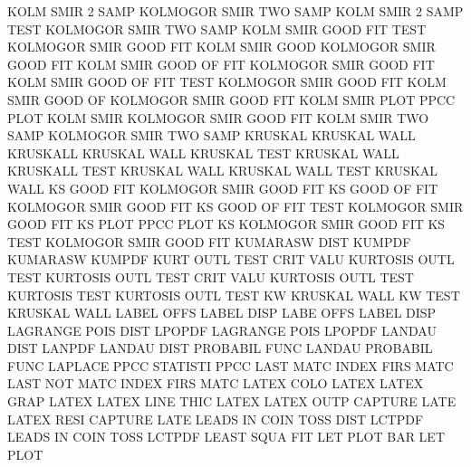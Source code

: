 KOLM     SMIR 2    SAMP                 KOLMOGOR SMIR TWO  SAMP
KOLM     SMIR 2    SAMP TEST            KOLMOGOR SMIR TWO  SAMP
KOLM     SMIR GOOD FIT  TEST            KOLMOGOR SMIR GOOD FIT
KOLM     SMIR GOOD                      KOLMOGOR SMIR GOOD FIT
KOLM     SMIR GOOD OF   FIT             KOLMOGOR SMIR GOOD FIT
KOLM     SMIR GOOD OF   FIT  TEST       KOLMOGOR SMIR GOOD FIT
KOLM     SMIR GOOD OF                   KOLMOGOR SMIR GOOD FIT
KOLM     SMIR PLOT                      PPCC     PLOT
KOLM     SMIR                           KOLMOGOR SMIR GOOD FIT
KOLM     SMIR TWO  SAMP                 KOLMOGOR SMIR TWO  SAMP
KRUSKAL                                 KRUSKAL  WALL
KRUSKALL                                KRUSKAL  WALL
KRUSKAL  TEST                           KRUSKAL  WALL
KRUSKALL TEST                           KRUSKAL  WALL
KRUSKAL  WALL TEST                      KRUSKAL  WALL
KS       GOOD FIT                       KOLMOGOR SMIR GOOD FIT
KS       GOOD OF   FIT                  KOLMOGOR SMIR GOOD FIT
KS       GOOD OF   FIT  TEST            KOLMOGOR SMIR GOOD FIT
KS       PLOT                           PPCC     PLOT
KS                                      KOLMOGOR SMIR GOOD FIT
KS       TEST                           KOLMOGOR SMIR GOOD FIT
KUMARASW DIST                           KUMPDF
KUMARASW                                KUMPDF
KURT     OUTL TEST CRIT VALU            KURTOSIS OUTL TEST
KURTOSIS OUTL TEST CRIT VALU            KURTOSIS OUTL TEST
KURTOSIS TEST                           KURTOSIS OUTL TEST
KW                                      KRUSKAL  WALL
KW       TEST                           KRUSKAL  WALL
LABEL    OFFS                           LABEL    DISP
LABE     OFFS                           LABEL    DISP
LAGRANGE POIS DIST                      LPOPDF
LAGRANGE POIS                           LPOPDF
LANDAU   DIST                           LANPDF
LANDAU   DIST                           PROBABIL FUNC
LANDAU                                  PROBABIL FUNC
LAPLACE  PPCC                           STATISTI PPCC
LAST     MATC                           INDEX    FIRS MATC
LAST     NOT  MATC                      INDEX    FIRS MATC
LATEX    COLO                           LATEX
LATEX    GRAP                           LATEX
LATEX    LINE THIC                      LATEX
LATEX    OUTP                           CAPTURE  LATE
LATEX    RESI                           CAPTURE  LATE
LEADS    IN   COIN TOSS DIST            LCTPDF
LEADS    IN   COIN TOSS                 LCTPDF
LEAST    SQUA                           FIT
LET      PLOT BAR                       LET      PLOT

